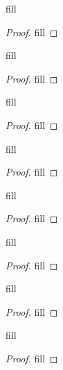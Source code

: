 \begin{exercise}{38}
fill
\end{exercise}
\begin{proof}
fill
\end{proof} 

\begin{exercise}{40}
fill
\end{exercise}
\begin{proof}
fill
\end{proof} 

\begin{exercise}{42}
fill
\end{exercise}
\begin{proof}
fill
\end{proof} 

\begin{exercise}{43}
fill
\end{exercise}
\begin{proof}
fill
\end{proof} 

\begin{exercise}{46}
fill
\end{exercise}
\begin{proof}
fill
\end{proof} 

\begin{exercise}{47}
fill
\end{exercise}
\begin{proof}
fill
\end{proof} 

\begin{exercise}{48}
fill
\end{exercise}
\begin{proof}
fill
\end{proof} 

\begin{exercise}{49}
fill
\end{exercise}
\begin{proof}
fill
\end{proof} 